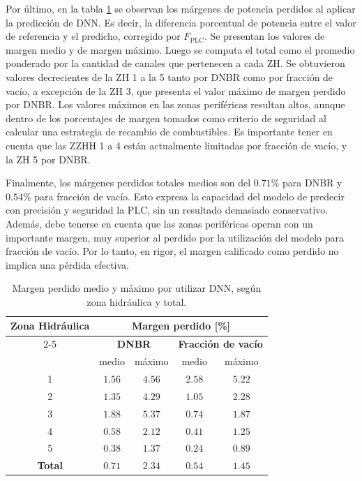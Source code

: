Por último, en la tabla \ref{tab:plc_margen_perdido} se observan los márgenes de potencia perdidos al aplicar la predicción de DNN. Es decir, la diferencia porcentual de potencia entre el valor de referencia y el predicho, corregido por $F_\mathrm{PLC}$. Se presentan los valores de margen medio y de margen máximo. Luego se computa el total como el promedio ponderado por la cantidad de canales que pertenecen a cada ZH.
Se obtuvieron valores decrecientes de la ZH 1 a la 5 tanto por DNBR como por fracción de vacío, a excepción de la ZH 3, que presenta el valor máximo de margen perdido por DNBR. Los valores máximos en las zonas periféricas resultan altos, aunque dentro de los porcentajes de margen tomados como criterio de seguridad al calcular una estrategia de recambio de combustibles.
Es importante tener en cuenta que las ZZHH 1 a 4 están actualmente limitadas por fracción de vacío, y la ZH 5 por DNBR. 

Finalmente, los márgenes perdidos totales medios son del $0.71$\% para DNBR y $0.54$\% para fracción de vacío. Esto expresa la capacidad del modelo de predecir con precisión y seguridad la PLC, sin un resultado demasiado conservativo. Además, debe tenerse en cuenta que las zonas periféricas operan con un importante margen, muy superior al perdido por la utilización del modelo para fracción de vacío. Por lo tanto, en rigor, el margen calificado como perdido no implica una pérdida efectiva.

\begin{table}[H]
	\centering
	\caption{Margen perdido medio y máximo por utilizar DNN, según zona hidráulica y total.}
	\begin{tabular}{c c c c c } 
        \toprule
        \multirow{3}{*}{\textbf{Zona Hidráulica}} & \multicolumn{4}{c}{\textbf{Margen perdido [\%]}} \\ \cline{2-5}
        & \multicolumn{2}{c}{\textbf{DNBR}} & \multicolumn{2}{c}{\textbf{Fracción de vacío}} \\
          & medio & máximo & medio & máximo \\ \hline
        1 & $1.56$ & $4.56$ & $2.58$ & $5.22$ \\
        2 & $1.35$ & $4.29$ & $1.05$ & $2.28$ \\
        3 & $1.88$ & $5.37$ & $0.74$ & $1.87$ \\
        4 & $0.58$ & $2.12$ & $0.41$ & $1.25$ \\
        5 & $0.38$ & $1.37$ & $0.24$ & $0.89$ \\ \hline
        \textbf{Total} & $0.71$ & $2.34$ & $0.54$ & $1.45$ \\
		\bottomrule
	\end{tabular}
	\label{tab:plc_margen_perdido}
\end{table}

